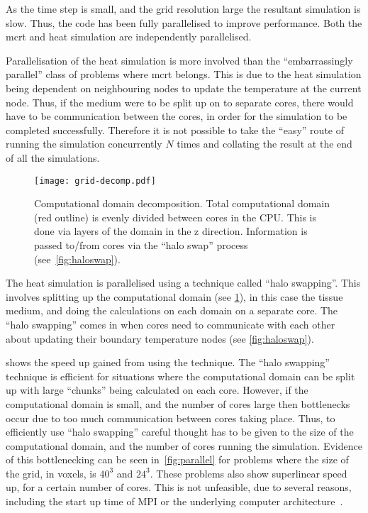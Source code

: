 As the time step is small, and the grid resolution large the resultant simulation is slow. Thus, the code has been fully parallelised to improve performance. Both the \gls*{mcrt} and heat simulation are independently parallelised. 

\medskip

Parallelisation of the heat simulation is more involved than the ``embarrassingly parallel'' class of problems where \gls*{mcrt} belongs. This is due to the heat simulation being dependent on neighbouring nodes to update the temperature at the current node. Thus, if the medium were to be split up on to separate cores, there would have to be communication between the cores, in order for the simulation to be completed successfully. Therefore it is not possible to take the ``easy'' route of running the simulation concurrently $N$ times and collating the result at the end of all the simulations.


\begin{figure}[!htbp]
\centering
\texttt{[image: grid-decomp.pdf]}
\caption{Computational domain decomposition. Total computational domain (red outline) is evenly divided between cores in the CPU. This is done via layers of the domain in the z direction. Information is passed to/from cores via the ``halo swap'' process (see~\cref{fig:haloswap}).}
\label{fig:griddecomp}
\end{figure}

The heat simulation is parallelised using a technique called ``halo swapping''. This involves splitting up the computational domain (see \cref{fig:griddecomp}), in this case the tissue medium, and doing the calculations on each domain on a separate core. The ``halo swapping'' comes in when cores need to communicate with each other about updating their boundary temperature nodes (see \cref{fig:haloswap}).

 shows the speed up gained from using the technique. The ``halo swapping'' technique is efficient for situations where the computational domain can be split up with large ``chunks'' being calculated on each core. However, if the computational domain is small, and the number of cores large then bottlenecks occur due to too much communication between cores taking place. Thus, to efficiently use ``halo swapping'' careful thought has to be given to the size of the computational domain, and the number of cores running the simulation. Evidence of this bottlenecking can be seen in~\cref{fig:parallel} for problems where the size of the grid, in voxels, is $40^3$ and $24^3$. These problems also show superlinear speed up, for a certain number of cores. This is not unfeasible, due to several reasons, including the start up time of MPI or the underlying computer architecture~\cite{ristov2016superlinear}.

